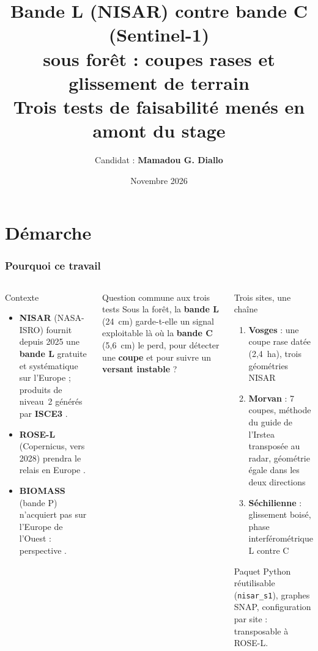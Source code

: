 \documentclass[aspectratio=169]{beamer}
\title{\large
	Bande L (NISAR) contre bande C (Sentinel-1)\\
	sous forêt : coupes rases et glissement de terrain\\[4pt]
	{\normalsize Trois tests de faisabilité menés en amont du stage}
}
\author{%
	Candidat : \textbf{Mamadou G. Diallo}
}
\date{Novembre 2026}
\newcommand{\Lb}[1]{\textcolor{Lband}{\textbf{#1}}}
\newcommand{\Cb}[1]{\textcolor{Cband}{\textbf{#1}}}
\begin{document}
\begin{frame}
	\titlepage
\end{frame}

\section{Démarche}

\begin{frame}{\phantom{x}}
	\frametitle{Pourquoi ce travail}
	\vspace{-6pt}\scriptsize
	\begin{columns}[T]
		\begin{block}{Contexte}
			\scriptsize
			\begin{itemize}
				\setlength{\itemsep}{2pt}
				\item \Lb{NISAR} (NASA-ISRO) fournit depuis 2025 une \Lb{bande L} gratuite et systématique sur
				l'Europe \parencite{kellogg2020nisar} ; produits de niveau~2 générés par \textbf{ISCE3}
				\parencite{isce3}.
				\item \textbf{ROSE-L} (Copernicus, vers 2028) prendra le relais en Europe \parencite{esa2020rosel}.
				\item \textbf{BIOMASS} (bande P) n'acquiert pas sur l'Europe de l'Ouest : perspective
				\parencite{quegan2019biomass}.
			\end{itemize}
		\end{block}
		\begin{block}{Question commune aux trois tests}
			\scriptsize
			Sous la forêt, la \Lb{bande L} (24~cm) garde-t-elle un signal exploitable là où la \Cb{bande C}
			(5,6~cm) le perd, pour détecter une \textbf{coupe} et pour suivre un \textbf{versant instable} ?
		\end{block}
		\begin{block}{Trois sites, une chaîne}
			\scriptsize
			\begin{enumerate}
				\setlength{\itemsep}{3pt}
				\item \textbf{Vosges} : une coupe rase datée (2,4~ha), trois géométries NISAR
				\item \textbf{Morvan} : 7 coupes, méthode du guide de l'Irstea transposée au radar, géométrie égale
				dans les deux directions
				\item \textbf{Séchilienne} : glissement boisé, phase interférométrique L contre C
			\end{enumerate}
			\vspace{2pt}
			Paquet Python réutilisable (\texttt{nisar\_s1}), graphes SNAP, configuration par site :
			transposable à ROSE-L.
		\end{block}
	\end{columns}
\end{frame}
\end{document}
